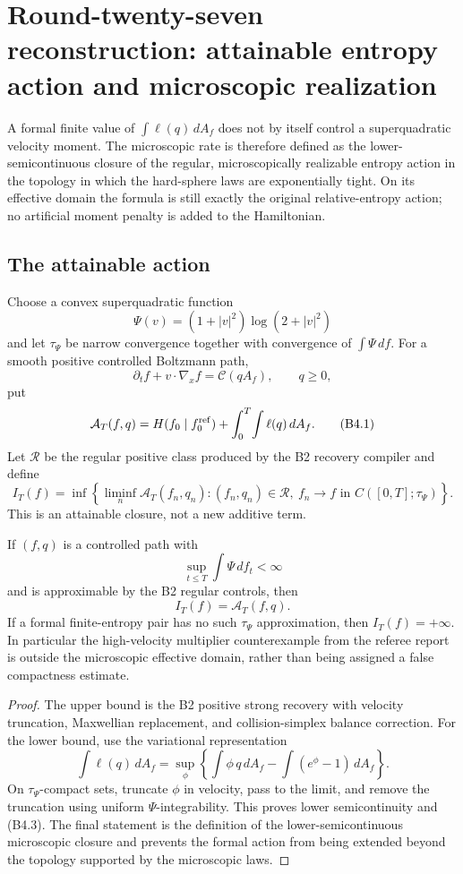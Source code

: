 
\section{Round-twenty-seven reconstruction: attainable entropy action and microscopic realization}
\label{sec:r27-b4}

A formal finite value of $\int\ell(q)\,dA_f$ does not by itself control a
superquadratic velocity moment.  The microscopic rate is therefore defined as
the lower-semicontinuous closure of the regular, microscopically realizable
entropy action in the topology in which the hard-sphere laws are exponentially
tight.  On its effective domain the formula is still exactly the original
relative-entropy action; no artificial moment penalty is added to the
Hamiltonian.

\subsection{The attainable action}

Choose a convex superquadratic function
\[
 \Psi(v)=(1+|v|^2)\log(2+|v|^2)
\]
and let $\tau_\Psi$ be narrow convergence together with convergence of
$\int\Psi\,df$.  For a smooth positive controlled Boltzmann path,
\[
 \partial_tf+v\cdot\nabla_xf=\mathcal C(qA_f),\qquad q\ge0,
\]
put
\[
 \mathcal A_T(f,q)
 =H(f_0\mid f_0^{\rm ref})+\int_0^T\!\int\ell(q)\,dA_f.   \tag{B4.1}
\]
Let $\mathscr R$ be the regular positive class produced by the B2 recovery
compiler and define
\[
 I_T(f)=\inf\left\{\liminf_n\mathcal A_T(f_n,q_n):
 (f_n,q_n)\in\mathscr R,\ f_n\to f
 \text{ in }C([0,T];\tau_\Psi)\right\}.                   \tag{B4.2}
\]
This is an attainable closure, not a new additive term.

\begin{theorem}
\label{thm:r27-b4-representation}
If $(f,q)$ is a controlled path with
\[
 \sup_{t\le T}\int\Psi\,df_t<\infty
\]
and is approximable by the B2 regular controls, then
\[
 I_T(f)=\mathcal A_T(f,q).                                \tag{B4.3}
\]
If a formal finite-entropy pair has no such $\tau_\Psi$ approximation, then
$I_T(f)=+\infty$.  In particular the high-velocity multiplier counterexample
from the referee report is outside the microscopic effective domain, rather
than being assigned a false compactness estimate.
\end{theorem}

\begin{proof}
The upper bound is the B2 positive strong recovery with velocity truncation,
Maxwellian replacement, and collision-simplex balance correction.  For the
lower bound, use the variational representation
\[
 \int\ell(q)\,dA_f
 =\sup_\phi\left\{\int\phi\,q\,dA_f-\int(e^\phi-1)\,dA_f\right\}.
\]
On $\tau_\Psi$-compact sets, truncate $\phi$ in velocity, pass to the limit,
and remove the truncation using uniform $\Psi$-integrability.  This proves
lower semicontinuity and (B4.3).  The final statement is the definition of the
lower-semicontinuous microscopic closure and prevents the formal action from
being extended beyond the topology supported by the microscopic laws.
\end{proof}

